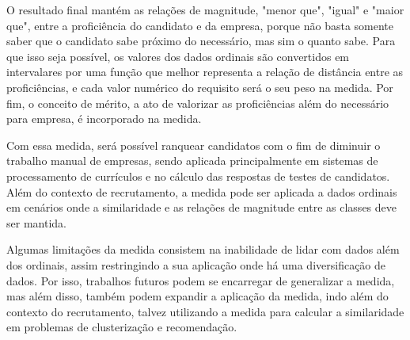 \documentclass[preprint,12pt]{elsarticle}
\begin{document}
O resultado final mantém as relações de magnitude, "menor que", "igual" e "maior que", entre a proficiência do candidato e da empresa, porque não basta somente saber que o candidato sabe próximo do necessário, mas sim o quanto sabe. Para que isso seja possível, os valores dos dados ordinais são convertidos em intervalares por uma função que melhor representa a relação de distância entre as proficiências, e cada valor numérico do requisito será o seu peso na medida. Por fim, o conceito de mérito, a ato de valorizar as proficiências além do necessário para empresa, é incorporado na medida.

Com essa medida, será possível ranquear candidatos com o fim de diminuir o trabalho manual de empresas, sendo aplicada principalmente em sistemas de processamento de currículos e no cálculo das respostas de testes de candidatos. Além do contexto de recrutamento, a medida pode ser aplicada a dados ordinais em cenários onde a similaridade e as relações de magnitude entre as classes deve ser mantida.

Algumas limitações da medida consistem na inabilidade de lidar com dados além dos ordinais, assim restringindo a sua aplicação onde há uma diversificação de dados. Por isso, trabalhos futuros podem se encarregar de generalizar a medida, mas além disso, também podem expandir a aplicação da medida, indo além do contexto do recrutamento, talvez utilizando a medida para calcular a similaridade em problemas de clusterização e recomendação. 


 


\appendix
\end{document}
